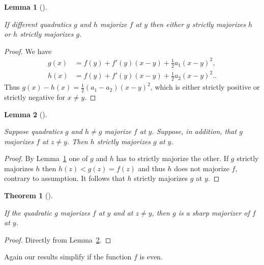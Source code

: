 \documentclass[
  12pt,
  letterpaper,
  DIV=11,
  numbers=noendperiod]{scrartcl}
\theoremstyle{plain}
\newtheorem{lemma}{Lemma}[section]
\theoremstyle{plain}
\newtheorem{theorem}{Theorem}[section]
\theoremstyle{plain}
\theoremstyle{definition}
\theoremstyle{definition}
\theoremstyle{remark}
\begin{document}
\begin{lemma}[]\protect\hypertarget{lem-fan}{}\label{lem-fan}

If different quadratics \(g\) and \(h\) majorize \(f\) at \(y\) then
either \(g\) strictly majorizes \(h\) or \(h\) strictly majorizes \(g\).

\end{lemma}

\begin{proof}
We have \begin{subequations}
\begin{align}
g(x)&=f(y)+f'(y)(x-y)+\frac12a_1(x-y)^2,\label{eq-gfunc}\\
h(x)&=f(y)+f'(y)(x-y)+\frac12a_2(x-y)^2.\label{eq-hfunc}.
\end{align}
\end{subequations} Thus \(g(x)-h(x)=\frac12(a_1-a_2)(x-y)^2\), which is
either strictly positive or strictly negative for \(x\not= y\).
\end{proof}

\begin{lemma}[]\protect\hypertarget{lem-ruit}{}\label{lem-ruit}

Suppose quadratics \(g\) and \(h\not= g\) majorize \(f\) at \(y\).
Suppose, in addition, that \(g\) majorizes \(f\) at \(z\not=y\). Then
\(h\) strictly majorizes \(g\) at \(y\).

\end{lemma}

\begin{proof}
By Lemma~\ref{lem-fan} one of \(g\) and \(h\) has to strictly majorize
the other. If \(g\) strictly majorizes \(h\) then \(h(z)<g(z)=f(z)\) and
thus \(h\) does not majorize \(f\), contrary to assumption. It follows
that \(h\) strictly majorizes \(g\) at \(y\).
\end{proof}

\begin{theorem}[]\protect\hypertarget{thm-ruit}{}\label{thm-ruit}

If the quadratic \(g\) majorizes \(f\) at \(y\) and at \(z\not= y\),
then \(g\) is a sharp majorizer of \(f\) at \(y\).

\end{theorem}

\begin{proof}
Directly from Lemma~\ref{lem-ruit}.
\end{proof}

Again our results simplify if the function \(f\) is even.
\end{document}
